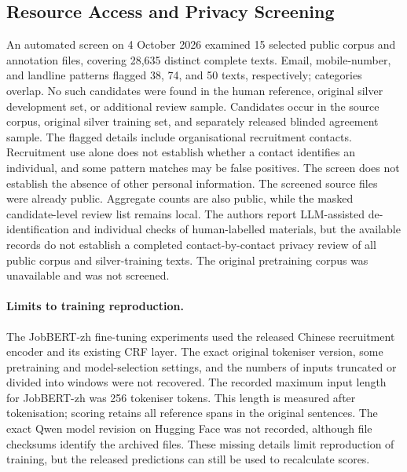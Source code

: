 \subsection{Resource Access and Privacy Screening}
\label{sec:resource-access}


\begin{samepage}
An automated screen on 4 October 2026 examined 15 selected public corpus and annotation files, covering 28,635 distinct complete texts. Email, mobile-number, and landline patterns flagged 38, 74, and 50 texts, respectively; categories overlap. No such candidates were found in the human reference, original silver development set, or additional review sample. Candidates occur in the source corpus, original silver training set, and separately released blinded agreement sample. The flagged details include organisational recruitment contacts. Recruitment use alone does not establish whether a contact identifies an individual, and some pattern matches may be false positives. The screen does not establish the absence of other personal information. The screened source files were already public. Aggregate counts are also public, while the masked candidate-level review list remains local. The authors report LLM-assisted de-identification and individual checks of human-labelled materials, but the available records do not establish a completed contact-by-contact privacy review of all public corpus and silver-training texts. The original pretraining corpus was unavailable and was not screened.\par
\end{samepage}

\paragraph{Limits to training reproduction.}
The JobBERT-zh fine-tuning experiments used the released Chinese recruitment encoder and its existing CRF layer. The exact original tokeniser version, some pretraining and model-selection settings, and the numbers of inputs truncated or divided into windows were not recovered. The recorded maximum input length for JobBERT-zh was 256 tokeniser tokens. This length is measured after tokenisation; scoring retains all reference spans in the original sentences. The exact Qwen model revision on Hugging Face was not recorded, although file checksums identify the archived files. These missing details limit reproduction of training, but the released predictions can still be used to recalculate scores.

\FloatBarrier
